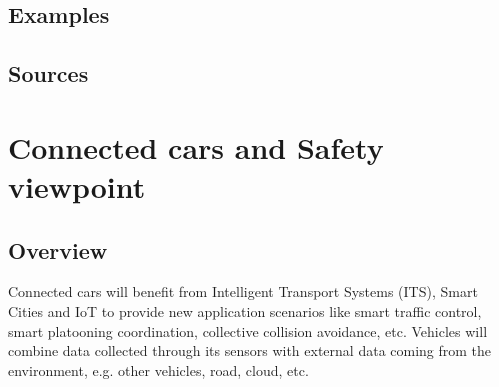 \subsection{Examples}

\subsection{Sources}

\section{Connected cars and Safety viewpoint}\label{sec:SoSviewpoint}

\subsection{Overview}
Connected cars will benefit from Intelligent Transport Systems (ITS), Smart Cities and IoT to provide new application scenarios like smart traffic control,  smart platooning coordination, collective collision avoidance, etc. 
Vehicles will combine data collected through its sensors %
with external data coming from the environment, e.g. other vehicles, road, cloud, etc. %

